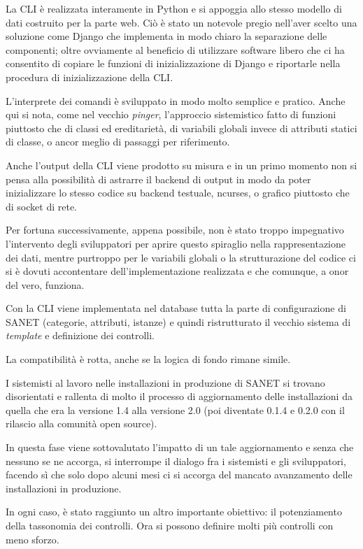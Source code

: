 \documentclass[a4wide,10pt,italian]{manual}
\begin{document}
La CLI è realizzata interamente in Python e si appoggia allo stesso modello di dati
costruito per la parte web. Ciò è stato un notevole pregio nell'aver scelto una soluzione come Django
che implementa in modo chiaro la separazione delle componenti; oltre ovviamente al beneficio
di utilizzare software libero che ci ha consentito di copiare le funzioni di inizializzazione di Django
e riportarle nella procedura di inizializzazione della CLI.

L'interprete dei comandi è sviluppato in modo molto semplice e pratico. Anche qui si nota, come nel vecchio \emph{pinger},
l'approccio sistemistico fatto di funzioni piuttosto che di classi ed ereditarietà, di variabili globali invece
di attributi statici di classe, o ancor meglio di passaggi per riferimento.

Anche l'output della CLI viene prodotto su misura e in un primo momento non si pensa alla possibilità di astrarre
il backend di output in modo da poter inizializzare lo stesso codice su backend testuale, ncurses, o grafico piuttosto che di socket di rete.

Per fortuna successivamente, appena possibile, non è stato troppo impegnativo l'intervento degli sviluppatori
per aprire questo spiraglio nella rappresentazione dei dati,
mentre purtroppo per le variabili globali o la strutturazione del codice ci si è dovuti accontentare
dell'implementazione realizzata e che comunque, a onor del vero, funziona.

Con la CLI viene implementata nel database tutta la parte di configurazione di SANET (categorie, attributi, istanze)
e quindi ristrutturato il vecchio sistema di \emph{template} e definizione dei controlli.

La compatibilità è rotta, anche se la logica di fondo rimane simile.

I sistemisti al lavoro nelle installazioni in produzione di SANET
si trovano disorientati e rallenta di molto il processo di aggiornamento delle installazioni da quella che era
la versione 1.4 alla versione 2.0 (poi diventate 0.1.4 e 0.2.0 con il rilascio alla comunità open source).

In questa fase viene sottovalutato l'impatto di un tale aggiornamento e senza che nessuno se ne accorga,
si interrompe il dialogo fra i sistemisti e gli sviluppatori,
facendo sì che solo dopo alcuni mesi ci si accorga del mancato avanzamento delle installazioni in produzione.

In ogni caso, è stato raggiunto un altro importante obiettivo: il potenziamento della tassonomia dei controlli.
Ora si possono definire molti più controlli con meno sforzo.
\end{document}
